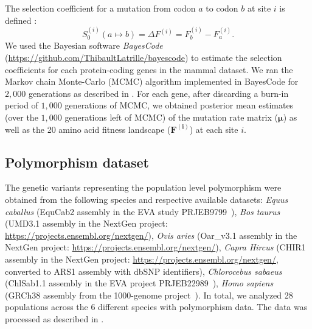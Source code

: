 \documentclass{article}
\newcommand{\UniDimArray}[1]{\bm{#1}}
\newcommand{\Sphy}{S_{0}}
\begin{document}
    The selection coefficient for a mutation from codon $a$ to codon $b$ at site $i$ is defined :
    \begin{equation}
        \Sphy^{(i)} (a \mapsto b) = \Delta F^{(i)} = F^{(i)}_{b} - F^{(i)}_{a}.
    \end{equation}
    We used the Bayesian software \textit{BayesCode} (\url{https://github.com/ThibaultLatrille/bayescode}) to estimate the selection coefficients for each protein-coding genes in the mammal dataset.
    We ran the Markov chain Monte-Carlo (MCMC) algorithm implemented in BayesCode for $2,000$ generations as described in \textcite{latrille_genes_2022}.
    For each gene, after discarding a burn-in period of $1,000$ generations of MCMC, we obtained posterior mean estimates (over the $1,000$ generations left of MCMC) of the mutation rate matrix ($\UniDimArray{\mu}$) as well as the 20 amino acid fitness landscape ($\UniDimArray{F^{(i)}}$) at each site $i$.

    \subsection{Polymorphism dataset}
    \label{subsec:polymorphism-dataset}

    The genetic variants representing the population level polymorphism were obtained from the following species and respective available datasets: \textit{Equus caballus} (EquCab2 assembly in the EVA study PRJEB9799~\cite{alabri_whole_2020}), \textit{Bos taurus} (UMD3.1 assembly in the NextGen project: \url{https://projects.ensembl.org/nextgen/}), \textit{Ovis aries} (Oar\_v3.1 assembly in the NextGen project: \url{https://projects.ensembl.org/nextgen/}), \textit{Capra Hircus} (CHIR1 assembly in the NextGen project: \url{https://projects.ensembl.org/nextgen/}, converted to ARS1 assembly with dbSNP identifiers\cite{sherry_dbsnp_2001}), \textit{Chlorocebus sabaeus} (ChlSab1.1 assembly in the EVA project PRJEB22989~\cite{svardal_ancient_2017}), \textit{Homo sapiens} (GRCh38 assembly from the 1000-genome project~\cite{consortium_integrated_2012, the1000genomesprojectconsortium_global_2015}).
    In total, we analyzed 28 populations across the 6 different species with polymorphism data.
    The data was processed as described in \textcite{latrille_genes_2022}.
\end{document}
